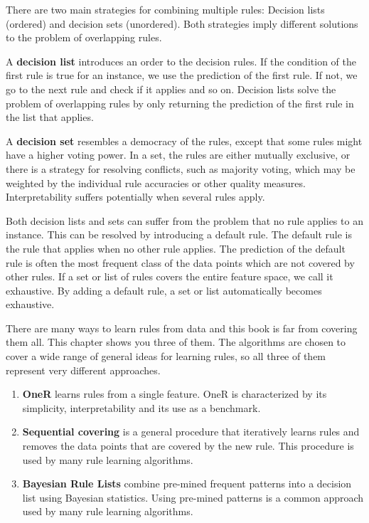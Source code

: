 \documentclass[12pt,]{krantz}
\providecommand{\tightlist}{%
  \setlength{\itemsep}{0pt}\setlength{\parskip}{0pt}}
\begin{document}
There are two main strategies for combining multiple rules: Decision
lists (ordered) and decision sets (unordered). Both strategies imply
different solutions to the problem of overlapping rules.

A \textbf{decision list} introduces an order to the decision rules. If
the condition of the first rule is true for an instance, we use the
prediction of the first rule. If not, we go to the next rule and check
if it applies and so on. Decision lists solve the problem of overlapping
rules by only returning the prediction of the first rule in the list
that applies.

A \textbf{decision set} resembles a democracy of the rules, except that
some rules might have a higher voting power. In a set, the rules are
either mutually exclusive, or there is a strategy for resolving
conflicts, such as majority voting, which may be weighted by the
individual rule accuracies or other quality measures. Interpretability
suffers potentially when several rules apply.

Both decision lists and sets can suffer from the problem that no rule
applies to an instance. This can be resolved by introducing a default
rule. The default rule is the rule that applies when no other rule
applies. The prediction of the default rule is often the most frequent
class of the data points which are not covered by other rules. If a set
or list of rules covers the entire feature space, we call it exhaustive.
By adding a default rule, a set or list automatically becomes
exhaustive.

There are many ways to learn rules from data and this book is far from
covering them all. This chapter shows you three of them. The algorithms
are chosen to cover a wide range of general ideas for learning rules, so
all three of them represent very different approaches.

\begin{enumerate}
\def\labelenumi{\arabic{enumi}.}
\tightlist
\item
  \textbf{OneR} learns rules from a single feature. OneR is
  characterized by its simplicity, interpretability and its use as a
  benchmark.
\item
  \textbf{Sequential covering} is a general procedure that iteratively
  learns rules and removes the data points that are covered by the new
  rule. This procedure is used by many rule learning algorithms.
\item
  \textbf{Bayesian Rule Lists} combine pre-mined frequent patterns into
  a decision list using Bayesian statistics. Using pre-mined patterns is
  a common approach used by many rule learning algorithms.
\end{enumerate}
\end{document}

